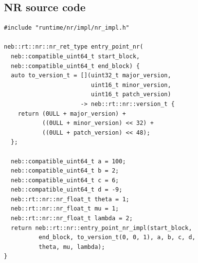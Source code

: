 \documentclass[11pt]{article}
\begin{document}
\subsection{NR source code}
\begin{lstlisting}
#include "runtime/nr/impl/nr_impl.h"

neb::rt::nr::nr_ret_type entry_point_nr(
  neb::compatible_uint64_t start_block,
  neb::compatible_uint64_t end_block) {
  auto to_version_t = [](uint32_t major_version,
                         uint16_t minor_version,
                         uint16_t patch_version)
                      -> neb::rt::nr::version_t {
    return (0ULL + major_version) +
           ((0ULL + minor_version) << 32) +
           ((0ULL + patch_version) << 48);
  };

  neb::compatible_uint64_t a = 100;
  neb::compatible_uint64_t b = 2;
  neb::compatible_uint64_t c = 6;
  neb::compatible_uint64_t d = -9;
  neb::rt::nr::nr_float_t theta = 1;
  neb::rt::nr::nr_float_t mu = 1;
  neb::rt::nr::nr_float_t lambda = 2;
  return neb::rt::nr::entry_point_nr_impl(start_block,
          end_block, to_version_t(0, 0, 1), a, b, c, d,
          theta, mu, lambda);
}
\end{lstlisting}
\end{document}
